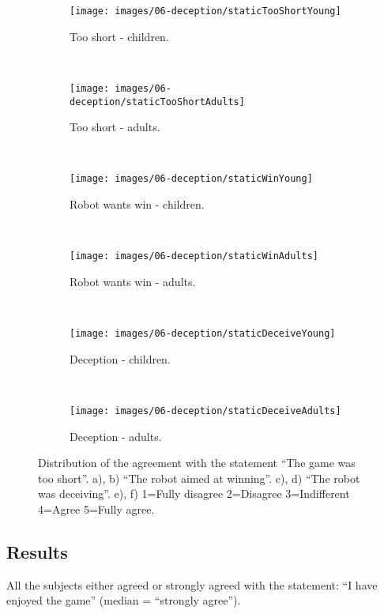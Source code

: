 \begin{figure}[h]
    \centering
    \begin{subfigure}[h]{0.49\columnwidth}
        \centering
        \texttt{[image: images/06-deception/staticTooShortYoung]}
        \caption{Too short - children.}
        \label{fig::staticTooShortYoung}
    \end{subfigure}
    ~
    \begin{subfigure}[h]{0.49\columnwidth}
        \centering
        \texttt{[image: images/06-deception/staticTooShortAdults]}
        \caption{Too short - adults.}
        \label{fig::staticTooShortAdults}
    \end{subfigure}
    ~
    \begin{subfigure}[h]{0.49\columnwidth}
        \centering
        \texttt{[image: images/06-deception/staticWinYoung]}
        \caption{Robot wants win - children.}
        \label{fig::staticWinYoung}
    \end{subfigure} 
    ~
    \begin{subfigure}[h]{0.49\columnwidth}
        \centering
        \texttt{[image: images/06-deception/staticWinAdults]}
        \caption{Robot wants win - adults.}
        \label{fig::staticWinAdults}
    \end{subfigure}
    ~
    \begin{subfigure}[h]{0.49\columnwidth}
        \centering
        \texttt{[image: images/06-deception/staticDeceiveYoung]}
        \caption{Deception - children.}
        \label{fig::staticDeceiveYoung}
    \end{subfigure} 
    ~
    \begin{subfigure}[h]{0.49\columnwidth}
        \centering
        \texttt{[image: images/06-deception/staticDeceiveAdults]}
        \caption{Deception - adults.}
        \label{fig::staticDeceiveAdults}
    \end{subfigure}
    \caption{Distribution of the agreement with the statement ``The game was too short''. a), b) ``The robot aimed at winning''. c), d) ``The robot was deceiving''. e), f) 1=Fully disagree 2=Disagree 3=Indifferent 4=Agree 5=Fully agree.}
\end{figure}

\subsection{Results}
All the subjects either agreed or strongly agreed with the statement: ``I have enjoyed the game'' (median = ``strongly agree'').

